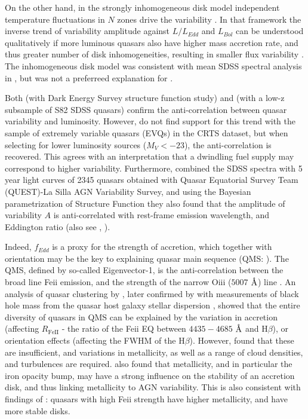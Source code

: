 \documentclass[twocolumn]{aastex62}
\let\oldAA\AA
\renewcommand{\AA}{\text{\normalfont\oldAA}}
\begin{document}
On the other hand, in the strongly inhomogeneous disk model independent temperature fluctuations in $N$ zones drive the variability \citep{dexter2011}. In that framework the inverse trend of variability amplitude against $L/L_{Edd}$  and $L_{Bol}$  can be understood qualitatively if more luminous quasars also have higher mass accretion rate, and thus greater number of disk inhomogeneities, resulting in smaller flux variability \citep{simm2016}. The inhomogeneous disk model was consistent with mean SDSS spectral analysis in \citet{ruan2014}, but was not a preferreed explanation for \citet{kokubo2015}. 

Both \citet{rumbaugh2018} (with Dark Energy Survey structure function study) and  \citet{sun2018}  (with a low-z subsample of S82 SDSS quasars) confirm the anti-correlation between quasar variability and luminosity. However, \citet{graham2019} do not find support for this trend with the sample of extremely variable quasars (EVQs) in the CRTS dataset,  but when selecting for lower luminosity sources ($M_{V} < -23$), the anti-correlation is recovered. This agrees with an interpretation that a dwindling fuel supply may correspond to higher variability. Furthermore, \citet{sanchez2018} combined the SDSS spectra with 5 year light curves of 2345 quasars obtained with Quasar Equatorial Survey Team (QUEST)-La Silla AGN Variability Survey, and  using the Bayesian parametrization of Structure Function \citep{schmidt2010} they also found that the amplitude of variability $A$ is anti-correlated with rest-frame emission wavelength,  and Eddington ratio (also see \citealt{simm2016}, \citealt{rakshit2017}).

Indeed, $f_{Edd}$ is a proxy for the strength of accretion, which together with orientation may be the key to explaining quasar main sequence (QMS: \citealt{shen2014, marziani2018}). The QMS, defined by so-called Eigenvector-1, is the anti-correlation between the broad line Fe{\sc ii} emission, and the strength of the narrow O{\sc iii} ($5007$ $\mbox{\AA}$) line \citep{wang1996}. An analysis of quasar clustering by \citet{shen2014}, later confirmed by \citet{sun2015} with measurements of  black hole mass from the quasar host galaxy stellar dispersion \citep{ferrarese2000, kormendy2013}, showed that the entire diversity of quasars in  QMS can be explained by the variation in accretion (affecting $R_{\mathrm{Fe  II}}$ - the ratio of the  Fe{\sc ii} EQ  between $4435-4685$ $\mbox{\AA}$ and H$\beta$), or orientation effects (affecting the FWHM of the H$\beta$). However, \citet{panda2019a, panda2019b} found that these are insufficient, and variations in metallicity, as well as a range of cloud densities, and turbulences are required.  \cite{jiang2016} also found that metallicity, and in particular the iron opacity bump, may have a strong influence on the stability of an accretion disk, and thus linking metallicity to AGN variability. This is also consistent with findings of \cite{sun2018}: quasars with high  Fe{\sc ii} strength have higher metallicity, and have more stable disks. 
\end{document}
